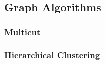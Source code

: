    





\subsection{Graph Algorithms} \label{sec:graph_graph_algorithms}

    \subsubsection{Multicut}

    \subsubsection{Hierarchical Clustering}


